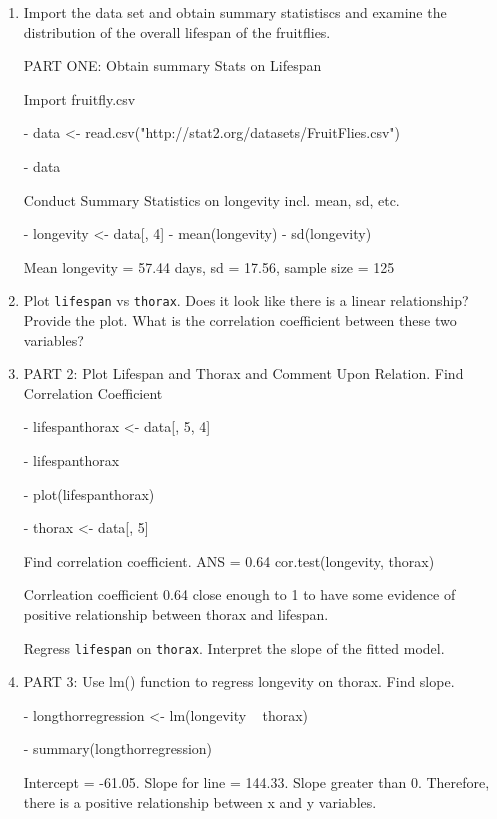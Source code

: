 \documentclass[12pt,letterpaper]{article}
\begin{document}
\begin{enumerate}
	
	\item
	Import the data set and obtain summary statistiscs and examine the distribution of the overall lifespan of the fruitflies.  

 PART ONE: Obtain summary Stats on Lifespan
 
 Import fruitfly.csv

- data <- read.csv("http://stat2.org/datasets/FruitFlies.csv")

- data

Conduct Summary Statistics on longevity incl. mean, sd, etc.

- longevity <- data[, 4]
- mean(longevity)
- sd(longevity)

Mean longevity = 57.44 days, sd = 17.56, sample size = 125

\newpage
	\item
	Plot \texttt{lifespan} vs \texttt{thorax}. Does it look like there is a linear relationship? Provide the plot. What is the correlation coefficient between these two variables?
		\vspace{6cm}
	\item
	
	PART 2: Plot Lifespan and Thorax and Comment Upon Relation. Find Correlation Coefficient
	
	- lifespanthorax <- data[, 5, 4]

	- lifespanthorax

	- plot(lifespanthorax)

	- thorax <- data[, 5]
	
	Find correlation coefficient. ANS = 0.64
	cor.test(longevity, thorax)

 Corrleation coefficient 0.64 close enough to 1 to have some evidence of positive relationship between thorax and lifespan.
	
	Regress \texttt{lifespan} on \texttt{thorax}.  Interpret the slope of the fitted model.
			\vspace{6cm}
	\item
	
	PART 3: Use lm() function to regress longevity on thorax. Find slope.

	- longthorregression <- lm(longevity ~ thorax)

- 	summary(longthorregression)

 Intercept = -61.05. Slope for line = 144.33. Slope greater than 0. Therefore, there is a positive relationship between x and y variables.
 

\end{enumerate}
\end{document}
